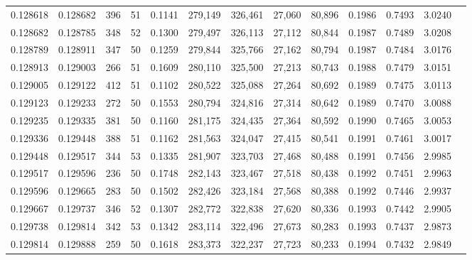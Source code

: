 \begin{tabular}{rrrrrrrrrrrrr}
0.128618 & 0.128682 &   396 &  51 &                                     0.1141 & 279,149 & 326,461 &  27,060 &  80,896 & 0.1986 & 0.7493 & 3.0240 \\
0.128682 & 0.128785 &   348 &  52 &                                     0.1300 & 279,497 & 326,113 &  27,112 &  80,844 & 0.1987 & 0.7489 & 3.0208 \\
0.128789 & 0.128911 &   347 &  50 &                                     0.1259 & 279,844 & 325,766 &  27,162 &  80,794 & 0.1987 & 0.7484 & 3.0176 \\
0.128913 & 0.129003 &   266 &  51 &                                     0.1609 & 280,110 & 325,500 &  27,213 &  80,743 & 0.1988 & 0.7479 & 3.0151 \\
0.129005 & 0.129122 &   412 &  51 &                                     0.1102 & 280,522 & 325,088 &  27,264 &  80,692 & 0.1989 & 0.7475 & 3.0113 \\
0.129123 & 0.129233 &   272 &  50 &                                     0.1553 & 280,794 & 324,816 &  27,314 &  80,642 & 0.1989 & 0.7470 & 3.0088 \\
0.129235 & 0.129335 &   381 &  50 &                                     0.1160 & 281,175 & 324,435 &  27,364 &  80,592 & 0.1990 & 0.7465 & 3.0053 \\
0.129336 & 0.129448 &   388 &  51 &                                     0.1162 & 281,563 & 324,047 &  27,415 &  80,541 & 0.1991 & 0.7461 & 3.0017 \\
0.129448 & 0.129517 &   344 &  53 &                                     0.1335 & 281,907 & 323,703 &  27,468 &  80,488 & 0.1991 & 0.7456 & 2.9985 \\
0.129517 & 0.129596 &   236 &  50 &                                     0.1748 & 282,143 & 323,467 &  27,518 &  80,438 & 0.1992 & 0.7451 & 2.9963 \\
0.129596 & 0.129665 &   283 &  50 &                                     0.1502 & 282,426 & 323,184 &  27,568 &  80,388 & 0.1992 & 0.7446 & 2.9937 \\
0.129667 & 0.129737 &   346 &  52 &                                     0.1307 & 282,772 & 322,838 &  27,620 &  80,336 & 0.1993 & 0.7442 & 2.9905 \\
0.129738 & 0.129814 &   342 &  53 &                                     0.1342 & 283,114 & 322,496 &  27,673 &  80,283 & 0.1993 & 0.7437 & 2.9873 \\
0.129814 & 0.129888 &   259 &  50 &                                     0.1618 & 283,373 & 322,237 &  27,723 &  80,233 & 0.1994 & 0.7432 & 2.9849 \\

\end{tabular}
